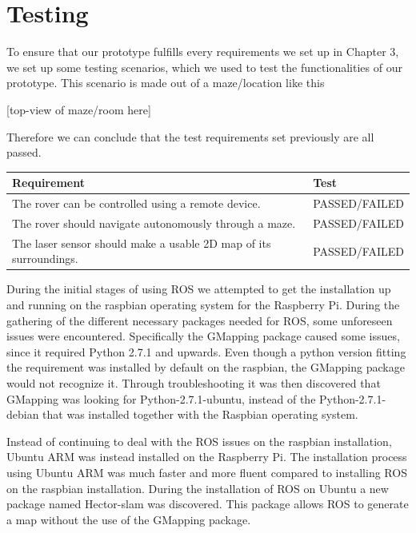 \clearpage
\section{Testing}

To ensure that our prototype fulfills every requirements we set up in Chapter 3, we set up some testing scenarios, which we used to test the functionalities of our prototype. This scenario is made out of a maze/location like this

[top-view of maze/room here]



Therefore we can conclude that the test requirements set previously are all passed.

\begin{table}[H]
	\begin{tabular}{|l|l|}
		\hline
		\textbf{Requirement} & \textbf{Test} \\ \hline
		The rover can be controlled using a remote device. & PASSED/FAILED \\ \hline
		The rover should navigate autonomously through a maze. & PASSED/FAILED \\ \hline
		The laser sensor should make a usable 2D map of its surroundings. & PASSED/FAILED \\ \hline
	\end{tabular}
\end{table}


\clearpage

During the initial stages of using ROS we attempted to get the installation up and running on the raspbian operating system for the Raspberry Pi. During the gathering of the different necessary packages needed for ROS, some unforeseen issues were encountered. Specifically the GMapping package caused some issues, since it required Python 2.7.1 and upwards. Even though a python version fitting the requirement was installed by default on the raspbian, the GMapping package would not recognize it. Through troubleshooting it was then discovered that GMapping was looking for Python-2.7.1-ubuntu, instead of the Python-2.7.1-debian that was installed together with the Raspbian operating system.

Instead of continuing to deal with the ROS issues on the raspbian installation, Ubuntu ARM was instead installed on the Raspberry Pi.
The installation process using Ubuntu ARM was much faster and more fluent compared to installing ROS on the raspbian installation. During the installation of ROS on Ubuntu a new package named Hector-slam was discovered. 
This package allows ROS to generate a map without the use of the GMapping package.

